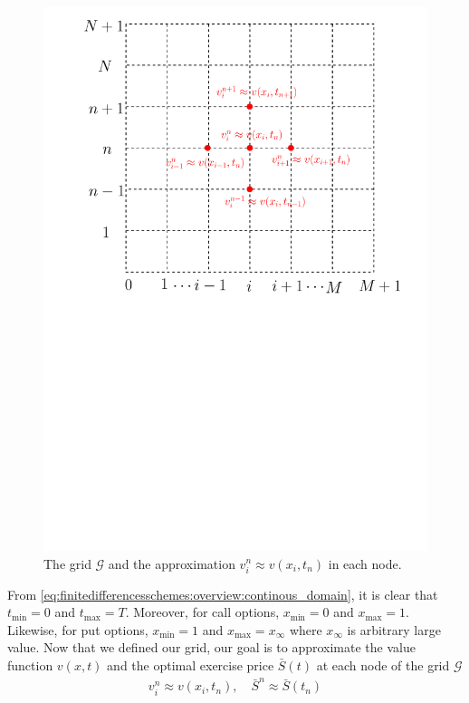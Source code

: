 \begin{figure}[H]
  \label{fig:finitedifferencesschemes:overview:grid}
  \centering
  \includegraphics[scale=0.5]{chapters/chapter3/GridAproximation.pdf}
  \caption{The grid $\mathcal{G}$ and the approximation $v^{n}_{i} \approx v(x_i, t_n)$ in each node.}
\end{figure}
From \eqref{eq:finitedifferencesschemes:overview:continous_domain}, it is clear that $t_\text{min} = 0$ and $t_\text{max}=T$. Moreover, for call options, $x_\text{min} = 0$ and $x_\text{max}=1$. Likewise, for put options, $x_\text{min}=1$ and $x_\text{max}=x_\infty$ where $x_\infty$ is arbitrary large value.
Now that we defined our grid, our goal is to approximate the value function $v(x, t)$ and the optimal exercise price $\bar{S}(t)$ at each node of the grid $\mathcal{G}$
\begin{align*}
  v^{n}_i \approx v(x_i,t_n), \quad \bar{S}^{n} \approx \bar{S}(t_n)
\end{align*}
